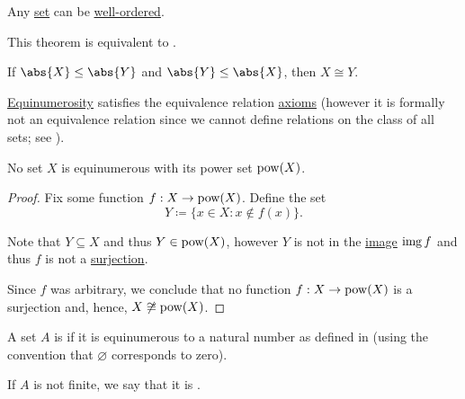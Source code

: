 \begin{theorem}\label{thm:well_ordering_principle}
  Any \hyperref[def:set]{set} can be \hyperref[def:well_ordered_set]{well-ordered}.

  This theorem is equivalent to .
\end{theorem}

\begin{theorem}\label{thm:cantor_schroder_bernstein}
  If \( \abs{X} \leq \abs{Y} \) and \( \abs{Y} \leq \abs{X} \), then \( X \cong Y \).
\end{theorem}

\medskip

\begin{proposition}\label{thm:equinumerousity_equivalence}
  \hyperref[def:equinumerous_sets]{Equinumerosity} satisfies the equivalence relation \hyperref[def:equivalence_relation]{axioms} (however it is formally not an equivalence relation since we cannot define relations on the class of all sets; see ).
\end{proposition}

\begin{theorem}[Cantor]\label{thm:cantor_power_set_theorem}
  No set \( X \) is equinumerous with its power set \( \operatorname{pow}(X) \).
\end{theorem}
\begin{proof}
  Fix some function \( f: X \to \operatorname{pow}(X) \). Define the set
  \begin{equation*}
    Y \coloneqq \{ x \in X \colon x \not\in f(x) \}.
  \end{equation*}

  Note that \( Y \subseteq X \) and thus \( Y \in \operatorname{pow}(X) \), however \( Y \) is not in the \hyperref[def:function]{image} \( \operatorname{img} f \) and thus \( f \) is not a \hyperref[def:function_invertibility/surjective]{surjection}.

  Since \( f \) was arbitrary, we conclude that no function \( f: X \to \operatorname{pow}(X) \) is a surjection and, hence, \( X \not\cong \operatorname{pow}(X) \).
\end{proof}

\begin{definition}\label{def:finite_set}
  A set \( A \) is  if it is equinumerous to a natural number as defined in  (using the convention that \( \varnothing \) corresponds to zero).

  If \( A \) is not finite, we say that it is .
\end{definition}

